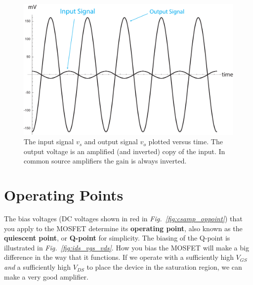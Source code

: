 \begin{figure}[H]
\centering
\includegraphics[width=.9\columnwidth]{gain}
\caption{The input signal $v_s$ and output signal $v_o$ plotted versus time.  The output voltage is an amplified (and inverted) copy of the input.  In common source amplifiers the gain is always inverted.}
\label{fig:gain}
\end{figure}
\newpage
\section{Operating Points}
The bias voltages (DC voltages shown in red in \emph{Fig.~\ref{fig:csamp_oppoint}}) that you apply to the MOSFET determine its \textbf{operating point}, also known as the \textbf{quiescent point}, or \textbf{Q-point} for simplicity.  The biasing of the Q-point is illustrated in \emph{Fig.~\ref{fig:ids_vgs_vds}}.  How you bias the MOSFET will make a big difference in the way that it functions.  If we operate with a sufficiently high $V_{GS}$ \emph{and} a sufficiently high $V_{DS}$ to place the device in the saturation region, we can make a very good amplifier.
